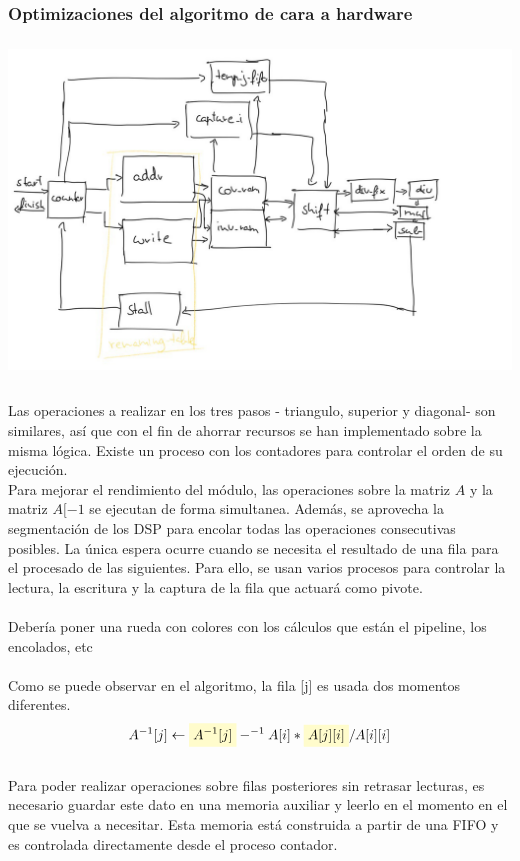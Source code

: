 \subsubsection{Optimizaciones del algoritmo de cara a hardware}
\includegraphics[height=3.5in]{figures/gauss.jpg}
\\
\\
Las operaciones a realizar en los tres pasos - triangulo, superior y diagonal- son similares, así que con el fin de ahorrar recursos se han implementado sobre la misma lógica. Existe un proceso con los contadores para controlar el orden de su ejecución.
\\
Para mejorar el rendimiento del módulo, las operaciones sobre la matriz $A$ y la matriz $A[{-1}$ se ejecutan de forma simultanea. Además, se aprovecha la segmentación de los DSP para encolar todas las operaciones consecutivas posibles. La única espera ocurre cuando se necesita el resultado de una fila para el procesado de las siguientes. Para ello, se usan varios procesos para controlar la lectura, la escritura y la captura de la fila que actuará como pivote.
\\
\\
Debería poner una rueda con colores con los cálculos que están el pipeline, los encolados, etc
\\
\\
\newcommand{\highlight}[1]{%
  \colorbox{yellow!20}{$\displaystyle#1$}}
Como se puede observar en el algoritmo, la fila [j] es usada dos momentos diferentes.
\[A^{-1}[j] \gets \highlight{A^{-1}[j]}-^{-1}A[i]*\highlight{A[j][i]}/A[i][i]\]
\\
Para poder realizar operaciones sobre filas posteriores sin retrasar lecturas, es necesario guardar este dato en una memoria auxiliar y leerlo en el momento en el que se vuelva a necesitar. Esta memoria está construida a partir de una FIFO y es controlada directamente desde el proceso contador.
